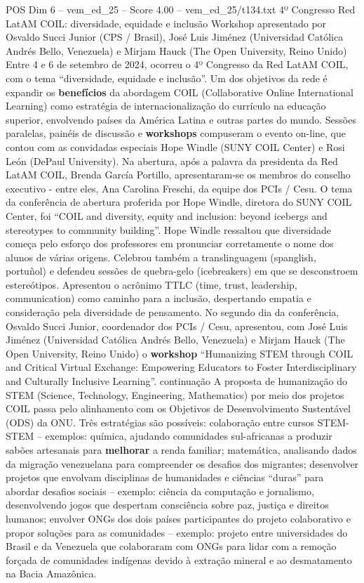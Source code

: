 \begin{textsample}{POS Dim 6 – vem\_ed\_25 – Score 4.00 – vem\_ed\_25/t134.txt}  \label{ex:f6_pos_094}
4º Congresso Red LatAM COIL: diversidade, equidade e inclusão Workshop apresentado por Osvaldo Succi Junior (CPS / Brasil), José Luis Jiménez (Universidad Católica Andrés Bello, Venezuela) e Mirjam Hauck (The Open University, Reino Unido) Entre 4 e 6 de setembro de 2024, ocorreu o 4º Congresso da Red LatAM COIL, com o tema “diversidade, equidade e inclusão”.
Um dos objetivos da rede é expandir os \textbf{benefícios} da abordagem COIL (Collaborative Online International Learning) como estratégia de internacionalização do currículo na educação superior, envolvendo países da América Latina e outras partes do mundo.
Sessões paralelas, painéis de discussão e \textbf{workshops} compuseram o evento on-line, que contou com as convidadas especiais Hope Windle (SUNY COIL Center) e Rosi León (DePaul University).
Na abertura, após a palavra da presidenta da Red LatAM COIL, Brenda García Portillo, apresentaram-se os membros do conselho executivo - entre eles, Ana Carolina Freschi, da equipe dos PCIs / Cesu.
O tema da conferência de abertura proferida por Hope Windle, diretora do SUNY COIL Center, foi “COIL and diversity, equity and inclusion: beyond icebergs and stereotypes to community building”.
Hope Windle ressaltou que diversidade começa pelo esforço dos professores em pronunciar corretamente o nome dos alunos de várias origens.
Celebrou também a translinguagem (spanglish, portuñol) e defendeu sessões de quebra-gelo (icebreakers) em que se desconstroem estereótipos.
Apresentou o acrônimo TTLC (time, trust, leadership, communication) como caminho para a inclusão, despertando empatia e consideração pela diversidade de pensamento.
No segundo dia da conferência, Osvaldo Succi Junior, coordenador dos PCIs / Cesu, apresentou, com José Luis Jiménez (Universidad Católica Andrés Bello, Venezuela) e Mirjam Hauck (The Open University, Reino Unido) o \textbf{workshop} “Humanizing STEM through COIL and Critical Virtual Exchange: Empowering Educators to Foster Interdisciplinary and Culturally Inclusive Learning”. continuação A proposta de humanização do STEM (Science, Technology, Engineering, Mathematics) por meio dos projetos COIL passa pelo alinhamento com os Objetivos de Desenvolvimento Sustentável (ODS) da ONU.
Três estratégias são possíveis: colaboração entre cursos STEM-STEM – exemplos: química, ajudando comunidades sul-africanas a produzir sabões artesanais para \textbf{melhorar} a renda familiar; matemática, analisando dados da migração venezuelana para compreender os desafios dos migrantes; desenvolver projetos que envolvam disciplinas de humanidades e ciências “duras” para abordar desafios sociais – exemplo: ciência da computação e jornalismo, desenvolvendo jogos que despertam consciência sobre paz, justiça e direitos humanos; envolver ONGs dos dois países participantes do projeto colaborativo e propor soluções para as comunidades – exemplo: projeto entre universidades do Brasil e da Venezuela que colaboraram com ONGs para lidar com a remoção forçada de comunidades indígenas devido à extração mineral e ao desmatamento na Bacia Amazônica.

\end{textsample}
